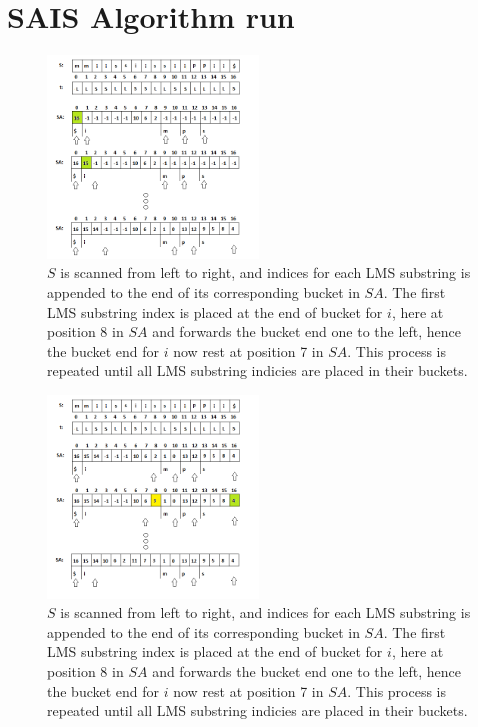 \documentclass[12pt]{article} %
\begin{document}
\section{SAIS Algorithm run}\label{SAIS Algorithm run}
\begin{figure}[H]
    \centering
    \includegraphics[width=0.5\textwidth]{SAIS_LMS2}
    \captionsetup{width=0.8\textwidth}
    \caption{$S$ is scanned from left to right, and indices for each LMS substring is appended to the end of its corresponding bucket in $SA$. The first LMS substring index is placed at the end of bucket for $i$, here at position 8 in $SA$ and forwards the bucket end one to the left, hence the bucket end for $i$ now rest at position 7 in $SA$. This process is repeated until all LMS substring indicies are placed in their buckets.}
    \label{fig:SAIS_LMS2}
\end{figure}
\begin{figure}[H]
    \centering
    \includegraphics[width=0.5\textwidth]{SAIS_LMS3}
    \captionsetup{width=0.8\textwidth}
    \caption{$S$ is scanned from left to right, and indices for each LMS substring is appended to the end of its corresponding bucket in $SA$. The first LMS substring index is placed at the end of bucket for $i$, here at position 8 in $SA$ and forwards the bucket end one to the left, hence the bucket end for $i$ now rest at position 7 in $SA$. This process is repeated until all LMS substring indicies are placed in their buckets.}
    \label{fig:SAIS_LMS3}
\end{figure}
\end{document}
